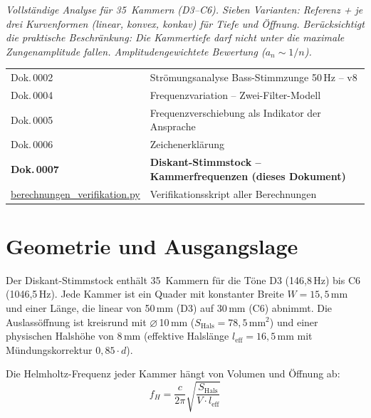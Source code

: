 \documentclass[11pt,a4paper]{article}
\begin{document}
\hbmaketitle

{\small\itshape Vollständige Analyse für 35~Kammern (D3--C6). Sieben Varianten: Referenz + je drei Kurvenformen (linear, konvex, konkav) für Tiefe und Öffnung. Berücksichtigt die praktische Beschränkung: Die Kammertiefe darf nicht unter die maximale Zungenamplitude fallen. Amplitudengewichtete Bewertung ($a_n \sim 1/n$).}

\vspace{2mm}
\begin{center}\small
\begin{tabularx}{\textwidth}{l X}
\hbtoprule
Dok.\,0002 & Strömungsanalyse Bass-Stimmzunge 50\,Hz -- v8 \\
Dok.\,0004 & Frequenzvariation -- Zwei-Filter-Modell \\
Dok.\,0005 & Frequenzverschiebung als Indikator der Ansprache \\
Dok.\,0006 & Zeichenerklärung \\
\textbf{Dok.\,0007} & \textbf{Diskant-Stimmstock -- Kammerfrequenzen (dieses Dokument)} \\
\midrule
\href{berechnungen_verifikation.py}{berechnungen\_verifikation.py} & Verifikationsskript aller Berechnungen \\
\bottomrule
\end{tabularx}
\end{center}
\vspace{4mm}


\section{Geometrie und Ausgangslage}

Der Diskant-Stimmstock enthält 35~Kammern für die Töne D3 (146{,}8\,Hz) bis C6 (1046{,}5\,Hz). Jede Kammer ist ein Quader mit konstanter Breite $W = 15{,}5$\,mm und einer Länge, die linear von 50\,mm (D3) auf 30\,mm (C6) abnimmt. Die Auslassöffnung ist kreisrund mit $\varnothing$\,10\,mm ($S_\text{Hals} = 78{,}5$\,mm$^2$) und einer physischen Halshöhe von 8\,mm (effektive Halslänge $l_\text{eff} = 16{,}5$\,mm mit Mündungskorrektur $0{,}85 \cdot d$).

Die Helmholtz-Frequenz jeder Kammer hängt von Volumen und Öffnung ab:
\begin{equation}
f_H = \frac{c}{2\pi}\sqrt{\frac{S_\text{Hals}}{V \cdot l_\text{eff}}}
\end{equation}
\end{document}
